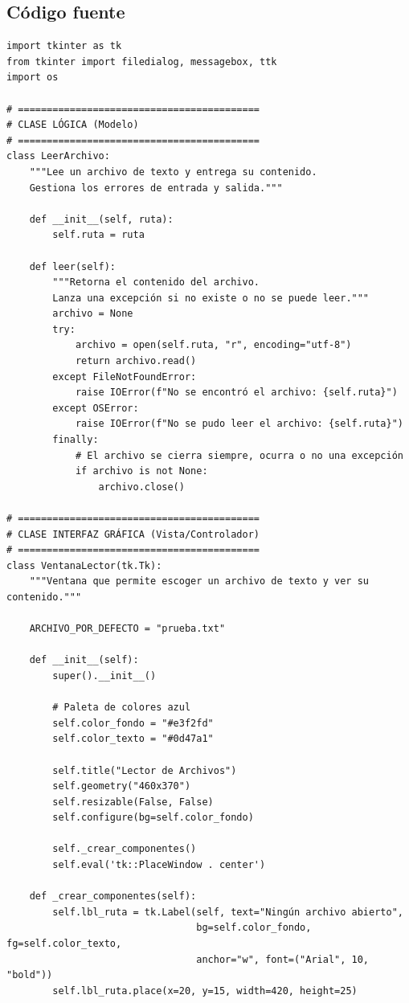 \documentclass[11pt, a4paper]{article}
\begin{document}
\subsection{Código fuente}
\begin{lstlisting}
import tkinter as tk
from tkinter import filedialog, messagebox, ttk
import os

# ==========================================
# CLASE LÓGICA (Modelo)
# ==========================================
class LeerArchivo:
    """Lee un archivo de texto y entrega su contenido.
    Gestiona los errores de entrada y salida."""

    def __init__(self, ruta):
        self.ruta = ruta

    def leer(self):
        """Retorna el contenido del archivo.
        Lanza una excepción si no existe o no se puede leer."""
        archivo = None
        try:
            archivo = open(self.ruta, "r", encoding="utf-8")
            return archivo.read()
        except FileNotFoundError:
            raise IOError(f"No se encontró el archivo: {self.ruta}")
        except OSError:
            raise IOError(f"No se pudo leer el archivo: {self.ruta}")
        finally:
            # El archivo se cierra siempre, ocurra o no una excepción
            if archivo is not None:
                archivo.close()

# ==========================================
# CLASE INTERFAZ GRÁFICA (Vista/Controlador)
# ==========================================
class VentanaLector(tk.Tk):
    """Ventana que permite escoger un archivo de texto y ver su contenido."""

    ARCHIVO_POR_DEFECTO = "prueba.txt"

    def __init__(self):
        super().__init__()

        # Paleta de colores azul
        self.color_fondo = "#e3f2fd"
        self.color_texto = "#0d47a1"

        self.title("Lector de Archivos")
        self.geometry("460x370")
        self.resizable(False, False)
        self.configure(bg=self.color_fondo)

        self._crear_componentes()
        self.eval('tk::PlaceWindow . center')

    def _crear_componentes(self):
        self.lbl_ruta = tk.Label(self, text="Ningún archivo abierto",
                                 bg=self.color_fondo, fg=self.color_texto,
                                 anchor="w", font=("Arial", 10, "bold"))
        self.lbl_ruta.place(x=20, y=15, width=420, height=25)


\end{lstlisting}
\end{document}
